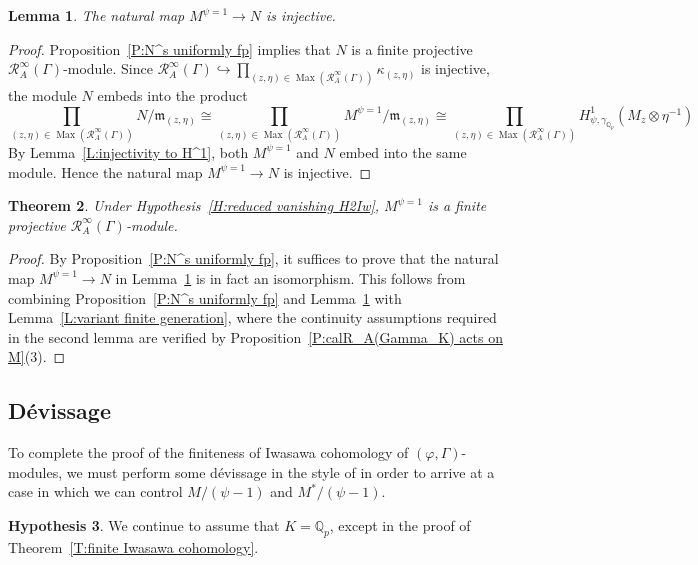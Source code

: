 \documentclass[12pt]{article}
\newtheorem{theorem}{Theorem}[subsection]
\newtheorem{lemma}[theorem]{Lemma}
\theoremstyle{definition}
\newtheorem{hypothesis}[theorem]{Hypothesis}
\numberwithin{equation}{theorem}
\newcommand{\calR}{\mathcal{R}}
\newcommand{\gothm}{\mathfrak{m}}
\newcommand{\QQ}{\mathbb{Q}}
\def\Qp{\QQ_p}
\DeclareMathOperator{\Max}{Max}
\begin{document}
\begin{lemma}
\label{L:M^psi=1 injects to N}
The natural map $M^{\psi=1} \to N$ is injective.
\end{lemma}
\begin{proof}
Proposition~\ref{P:N^s uniformly fp} implies that $N$ is a finite projective $\calR_A^\infty(\Gamma)$-module.  Since $\calR_A^\infty(\Gamma) \hookrightarrow \prod_{(z,\eta)\in\Max(\calR_A^\infty(\Gamma))} \kappa_{(z,\eta)}$ is injective,  the module $N$ embeds into the product 
\[
\prod_{(z,\eta)\in\Max(\calR_A^\infty(\Gamma))} N / \gothm_{(z,\eta)} \cong \prod_{(z,\eta)\in \Max(\calR_A^\infty(\Gamma))} M^{\psi=1} / \gothm_{(z,\eta)} \cong \prod_{(z,\eta)\in \Max(\calR_A^\infty(\Gamma))} H^1_{\psi, \gamma_{\Qp}}(M_z \otimes \eta^{-1})
\]
By Lemma~\ref{L:injectivity to H^1}, both $M^{\psi=1}$ and $N$ embed into the same module.  Hence the natural map $M^{\psi=1} \to N$ is injective.
\end{proof}

\begin{theorem}
\label{T:structure of M^psi=1}
Under Hypothesis~\ref{H:reduced vanishing H2Iw}, $M^{\psi=1}$ is a
finite projective $\calR_A^\infty(\Gamma)$-module.
\end{theorem}
\begin{proof}
By Proposition~\ref{P:N^s uniformly fp}, it suffices to prove that the natural map $M^{\psi=1} \to N$ in Lemma~\ref{L:M^psi=1 injects to N} is in fact an isomorphism.  This follows from combining Proposition~\ref{P:N^s uniformly fp} and Lemma~\ref{L:M^psi=1 injects to N} with
Lemma~\ref{L:variant finite generation}, where the continuity assumptions required in the second lemma are verified by Proposition~\ref{P:calR_A(Gamma_K) acts on M}(3).
\end{proof}



\subsection{D\'evissage}
\label{S:devissage}

To complete the proof of the finiteness of Iwasawa cohomology of $(\varphi, \Gamma)$-modules, we 
must perform some d\'evissage in the style of \cite{liu} in order to arrive at a case in which we can control $M/(\psi-1)$ and $M^*/(\psi-1)$.

\begin{hypothesis}
\label{H:devissage}
We continue to assume that $K=\Qp$, except in the proof of
Theorem~\ref{T:finite Iwasawa cohomology}.
\end{hypothesis}
\end{document}
